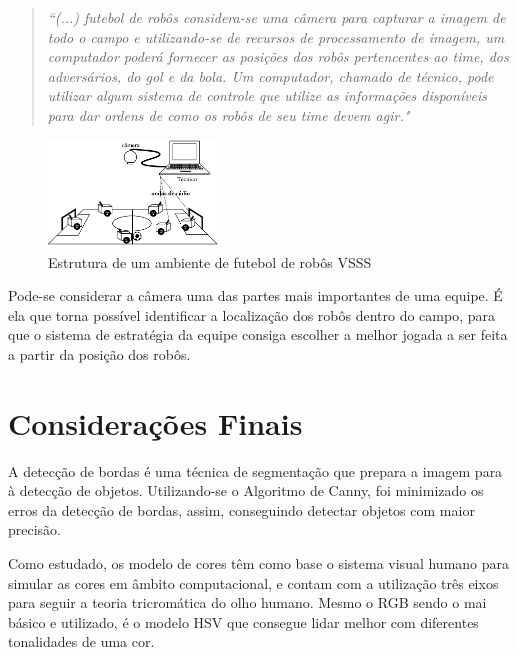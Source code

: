 \begin{quotation}
\textit{
``(...) futebol de robôs considera-se uma câmera para capturar
a imagem de todo o campo e utilizando-se de recursos de processamento de imagem, um
computador poderá fornecer as posições dos robôs pertencentes ao time, dos adversários,
do gol e da bola. Um computador, chamado de técnico, pode utilizar algum sistema de
controle que utilize as informações disponíveis para dar ordens de como os robôs de seu
time devem agir."}\cite{Faria2006}
\end{quotation}
 \begin{figure}[H]
	\centering
	\includegraphics[width=0.4\textwidth]{futbots.pdf}
	\caption{Estrutura de um ambiente de futebol de robôs VSSS\cite{Faria2006}}
	\label{fig:VSSS}
\end{figure} 

Pode-se considerar a câmera uma das partes mais importantes de uma equipe. É ela que torna possível identificar a localização dos robôs dentro do campo, para que o sistema de estratégia da equipe consiga escolher a melhor jogada a ser feita a partir da posição dos robôs. 
\section{Considerações Finais}
A detecção de bordas é uma técnica de segmentação que prepara a imagem para à detecção de objetos. Utilizando-se o Algoritmo de Canny, foi minimizado os erros da detecção de bordas, assim, conseguindo detectar objetos com maior precisão. 

Como estudado, os modelo de cores têm como base o sistema visual humano para simular as cores em âmbito computacional, e contam com a utilização três eixos para seguir a teoria tricromática do olho humano. Mesmo o RGB sendo o mai básico e utilizado, é o modelo HSV  que consegue lidar melhor com diferentes tonalidades de uma cor.
